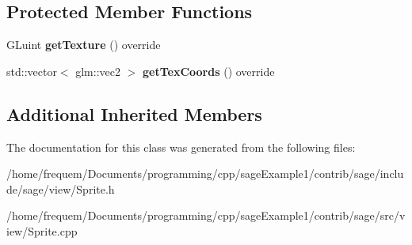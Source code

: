 \subsection*{Protected Member Functions}
\begin{DoxyCompactItemize}
\item 
\mbox{\label{classsage_1_1Sprite_aa75f3595b809f99847a9642ce2bf319a}} 
G\+Luint {\bfseries get\+Texture} () override
\item 
\mbox{\label{classsage_1_1Sprite_a3e5acc98484d2f326fdd1ff622cfd2ff}} 
std\+::vector$<$ glm\+::vec2 $>$ {\bfseries get\+Tex\+Coords} () override
\end{DoxyCompactItemize}
\subsection*{Additional Inherited Members}


The documentation for this class was generated from the following files\+:\begin{DoxyCompactItemize}
\item 
/home/frequem/\+Documents/programming/cpp/sage\+Example1/contrib/sage/include/sage/view/Sprite.\+h\item 
/home/frequem/\+Documents/programming/cpp/sage\+Example1/contrib/sage/src/view/Sprite.\+cpp\end{DoxyCompactItemize}
